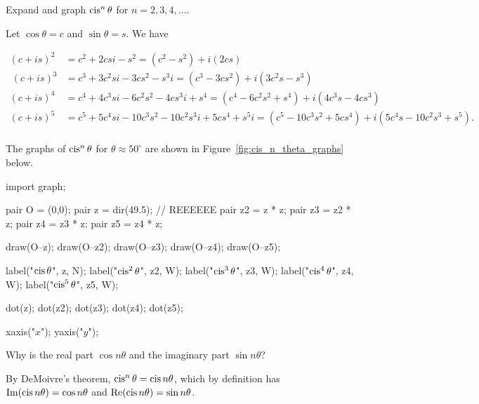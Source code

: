 \documentclass[../gatm_answers.tex]{subfiles}
\begin{document}
\begin{outer_problem}
\item Expand and graph $\operatorname{cis}^n \theta$ for $n=2,3,4,\ldots$.
\end{outer_problem}

Let $\cos\theta = c$ and $\sin\theta = s$. We have

\begin{align*}
(c+is)^2 &= c^2 + 2csi - s^2 = (c^2 - s^2) + i(2cs) \\\
(c+is)^3 &= c^3 + 3c^2si - 3cs^2 - s^3i = (c^3 - 3cs^2) + i(3c^2s - s^3) \\
(c+is)^4 &= c^4 + 4c^3si - 6c^2s^2 - 4cs^3i + s^4 = (c^4 - 6c^2s^2 + s^4) + i(4c^3s - 4cs^3) \\
(c+is)^5 &= c^5 + 5c^4si - 10c^3s^2 - 10c^2s^3i + 5cs^4 + s^5i = (c^5 - 10c^3s^2 + 5cs^4) + i(5c^4s - 10c^2s^3 + s^5). \\
\end{align*}

The graphs of $\operatorname{cis}^n\theta$ for $\theta \approx 50^\circ$ are shown in Figure~\ref{fig:cis_n_theta_graphs} below.

\begin{center}
\begin{asy}[width=0.4\textwidth]
import graph;

pair O = (0,0);
pair z = dir(49.5); // REEEEEE
pair z2 = z * z;
pair z3 = z2 * z;
pair z4 = z3 * z;
pair z5 = z4 * z;

draw(O--z);
draw(O--z2);
draw(O--z3);
draw(O--z4);
draw(O--z5);

label("$\operatorname{cis} \theta$", z, N);
label("$\operatorname{cis}^2 \theta$", z2, W);
label("$\operatorname{cis}^3 \theta$", z3, W);
label("$\operatorname{cis}^4 \theta$", z4, W);
label("$\operatorname{cis}^5 \theta$", z5, W);

dot(z);
dot(z2);
dot(z3);
dot(z4);
dot(z5);

xaxis("$x$");
yaxis("$y$");
\end{asy}
\label{fig:cis_n_theta_graphs}
\end{center}

\begin{inner_problem}[start=1]
\item Why is the real part $\cos n\theta$ and the imaginary part $\sin n\theta$?
\end{inner_problem}

By DeMoivre's theorem, $\operatorname{cis}^n\theta = \operatorname{cis} n\theta$, which by definition has $\operatorname{Im}(\operatorname{cis} n\theta) = \cos n\theta$ and $\operatorname{Re}(\operatorname{cis} n\theta) = \sin n\theta$.
\end{document}

